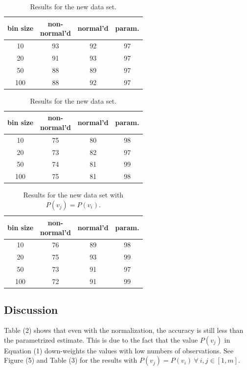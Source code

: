 \begin{table}[H]
\parbox{.45\linewidth}
{
  \centering
  \begin{tabular}{ c | c c c }
    bin size & \specialcell{non-\\normal'd} & normal'd & param. \\
    \hline
    10  & 93 & 92 & 97 \\
    20  & 91 & 93 & 97 \\
    50  & 88 & 89 & 97 \\
    100 & 88 & 92 & 97 \\
  \end{tabular}
  \caption{Results for the original data set.}
  \label{tbl:tablelabel}
}
\hfill
\parbox{.45\linewidth}
{
  \centering
  \begin{tabular}{ c | c c c }
    bin size & \specialcell{non-\\normal'd} & normal'd & param. \\
    \hline
    10  & 75 & 80 & 98 \\
    20  & 73 & 82 & 97 \\
    50  & 74 & 81 & 99 \\
    100 & 75 & 81 & 98 \\
  \end{tabular}
  \caption{Results for the new data set.}
  \label{tbl:tablelabel}
}
\end{table}

\begin{table}[H] 
\centering
\begin{tabular}{ c | c c c }
  bin size & \specialcell{non-\\normal'd} & normal'd & param. \\
  \hline
  10  & 76 & 89 & 98 \\
  20  & 75 & 93 & 99 \\
  50  & 73 & 91 & 97 \\
  100 & 72 & 91 & 99 \\
\end{tabular}
\caption{Results for the new data set with $P(v_j) = P(v_i)$.}
\label{tbl:tablelabel}
\end{table}

\subsection*{Discussion}

Table (2) shows that even with the normalization, the accuracy is still less than the parametrized estimate.  This is due to the fact that the value $P(v_j)$ in Equation (1) down-weights the values with low numbers of observations.  See Figure (5) and Table (3) for the results with $P(v_j) = P(v_i)\ \forall\ i,j \in [1,m]$.






